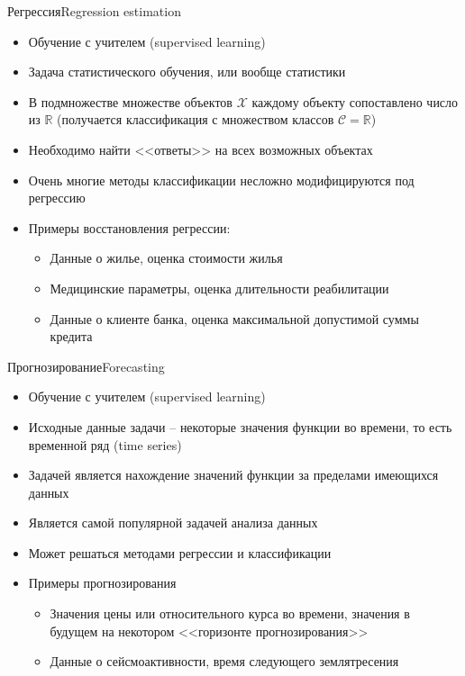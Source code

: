 \documentclass[compress,red,unicode]{beamer}
\begin{document}
\begin{frame}{Регрессия}{Regression estimation}
\begin{itemize}
	\item Обучение с учителем (supervised learning)
	\item Задача статистического обучения, или вообще статистики
	\item В подмножестве множестве объектов $\mathcal{X}$ каждому объекту сопоставлено число из $\mathbb{R}$ (получается классификация с множеством классов $\mathcal{C} = \mathbb{R}$)
	\item Необходимо найти <<ответы>> на всех возможных объектах
	\item Очень многие методы классификации несложно модифицируются под регрессию
	\item Примеры восстановления регрессии:
	\begin{itemize}
		\item Данные о жилье, {\color{main!90!black} оценка стоимости жилья}
		\item Медицинские параметры, {\color{main!90!black} оценка длительности реабилитации } 
		\item Данные о клиенте банка, {\color{main!90!black} оценка максимальной допустимой суммы кредита}
	\end{itemize}
\end{itemize}
\end{frame}

\begin{frame}{Прогнозирование}{Forecasting}
\begin{itemize}
	\item Обучение с учителем (supervised learning)
	\item Исходные данные задачи -- некоторые значения функции во времени, то есть временной ряд (time series)
	\item Задачей является нахождение значений функции за пределами имеющихся данных
	\item Является самой популярной задачей анализа данных 
	\item Может решаться методами регрессии и классификации
	\item Примеры прогнозирования
	\begin{itemize}
		\item Значения цены или относительного курса во времени, {\color{main!90!black} значения в будущем на некотором <<горизонте прогнозирования>>}
		\item Данные о сейсмоактивности, {\color{main!90!black} время следующего землятресения}
	\end{itemize}
\end{itemize}
\end{frame}
\end{document}
